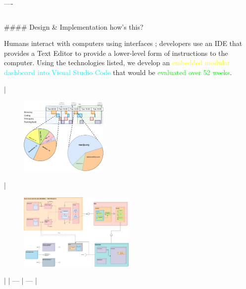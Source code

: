 \documentclass[]{beamer}
\begin{document}
\begin{frame}[fragile]
\begin{markdown}
\vspace{-0.5cm}

----

\end{markdown}

\vspace{-0.6cm}

\begin{columns}[T]

\begin{column}{.48\textwidth}

\begin{markdown}

#### Design \& Implementation {\scriptsize how's this?}

\footnotesize

Humans interact with computers using interfaces \cite{liCategorisationVisualisationMethods2016}; developers use an IDE that provides a \textcolor{red!30}{Text Editor} to provide a lower-level form of instructions to the computer. Using the technologies listed, we develop an \textcolor{yellow}{embedded modular} \textcolor{cyan}{dashboard into Visual Studio Code} that would be \textcolor{lime}{evaluated over 52 weeks}.

\vspace{-0.5cm}

| \begin{figure}\textcolor{black}{\includegraphics[width=0.38\textwidth]{sampleviz.pdf}}\end{figure} | \begin{figure}\textcolor{black}{\includegraphics[width=0.5\textwidth]{architecture.pdf}}\end{figure} | 
| --- | --- |


\end{markdown}
\end{column}
\end{columns}
\end{frame}
\end{document}
